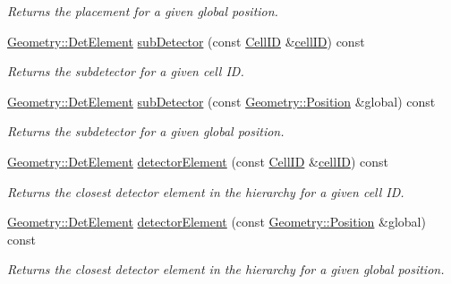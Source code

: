 \begin{DoxyCompactItemize}
\begin{DoxyCompactList}\small\item\em Returns the placement for a given global position. \end{DoxyCompactList}\item 
\hyperlink{class_d_d4hep_1_1_geometry_1_1_det_element}{Geometry\+::\+Det\+Element} \hyperlink{class_d_d4hep_1_1_d_d_rec_1_1_i_d_decoder_a3d8d0f881174f1d26284148abcbc9a69}{sub\+Detector} (const \hyperlink{namespace_d_d4hep_1_1_d_d_rec_af5cecc2e566eeaedb430b92df23971d4}{Cell\+ID} \&\hyperlink{class_d_d4hep_1_1_d_d_rec_1_1_i_d_decoder_abdd26643ae2f9f70de21b3a4699799bb}{cell\+ID}) const
\begin{DoxyCompactList}\small\item\em Returns the subdetector for a given cell ID. \end{DoxyCompactList}\item 
\hyperlink{class_d_d4hep_1_1_geometry_1_1_det_element}{Geometry\+::\+Det\+Element} \hyperlink{class_d_d4hep_1_1_d_d_rec_1_1_i_d_decoder_a053676aa5e152d800171dab3673cf258}{sub\+Detector} (const \hyperlink{namespace_d_d4hep_1_1_geometry_a55083902099d03506c6db01b80404900}{Geometry\+::\+Position} \&global) const
\begin{DoxyCompactList}\small\item\em Returns the subdetector for a given global position. \end{DoxyCompactList}\item 
\hyperlink{class_d_d4hep_1_1_geometry_1_1_det_element}{Geometry\+::\+Det\+Element} \hyperlink{class_d_d4hep_1_1_d_d_rec_1_1_i_d_decoder_ac6cf13ecf33d0e62b6871eaa134c6ccb}{detector\+Element} (const \hyperlink{namespace_d_d4hep_1_1_d_d_rec_af5cecc2e566eeaedb430b92df23971d4}{Cell\+ID} \&\hyperlink{class_d_d4hep_1_1_d_d_rec_1_1_i_d_decoder_abdd26643ae2f9f70de21b3a4699799bb}{cell\+ID}) const
\begin{DoxyCompactList}\small\item\em Returns the closest detector element in the hierarchy for a given cell ID. \end{DoxyCompactList}\item 
\hyperlink{class_d_d4hep_1_1_geometry_1_1_det_element}{Geometry\+::\+Det\+Element} \hyperlink{class_d_d4hep_1_1_d_d_rec_1_1_i_d_decoder_a42116917002ef466e286233fef6ca84a}{detector\+Element} (const \hyperlink{namespace_d_d4hep_1_1_geometry_a55083902099d03506c6db01b80404900}{Geometry\+::\+Position} \&global) const
\begin{DoxyCompactList}\small\item\em Returns the closest detector element in the hierarchy for a given global position. \end{DoxyCompactList}\item 

\end{DoxyCompactItemize}
